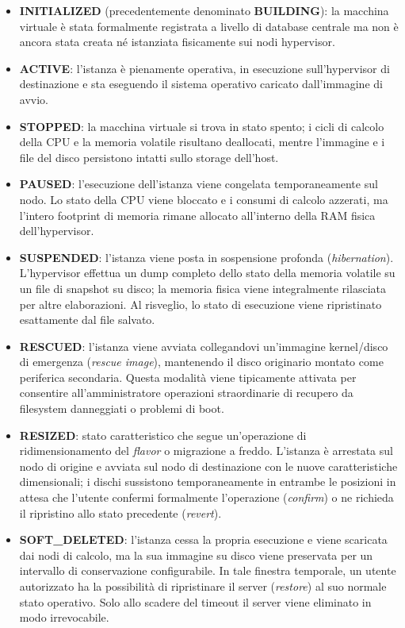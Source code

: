 \documentclass[11pt, a4paper]{article}
\begin{document}
\begin{itemize}[leftmargin=*]
    \item \textbf{INITIALIZED} (precedentemente denominato \textbf{BUILDING}): la macchina virtuale è stata formalmente registrata a livello di database centrale ma non è ancora stata creata né istanziata fisicamente sui nodi hypervisor.
    \item \textbf{ACTIVE}: l'istanza è pienamente operativa, in esecuzione sull'hypervisor di destinazione e sta eseguendo il sistema operativo caricato dall'immagine di avvio.
    \item \textbf{STOPPED}: la macchina virtuale si trova in stato spento; i cicli di calcolo della CPU e la memoria volatile risultano deallocati, mentre l'immagine e i file del disco persistono intatti sullo storage dell'host.
    \item \textbf{PAUSED}: l'esecuzione dell'istanza viene congelata temporaneamente sul nodo. Lo stato della CPU viene bloccato e i consumi di calcolo azzerati, ma l'intero footprint di memoria rimane allocato all'interno della RAM fisica dell'hypervisor.
    \item \textbf{SUSPENDED}: l'istanza viene posta in sospensione profonda (\emph{hibernation}). L'hypervisor effettua un dump completo dello stato della memoria volatile su un file di snapshot su disco; la memoria fisica viene integralmente rilasciata per altre elaborazioni. Al risveglio, lo stato di esecuzione viene ripristinato esattamente dal file salvato.
    \item \textbf{RESCUED}: l'istanza viene avviata collegandovi un'immagine kernel/disco di emergenza (\emph{rescue image}), mantenendo il disco originario montato come periferica secondaria. Questa modalità viene tipicamente attivata per consentire all'amministratore operazioni straordinarie di recupero da filesystem danneggiati o problemi di boot.
    \item \textbf{RESIZED}: stato caratteristico che segue un'operazione di ridimensionamento del \emph{flavor} o migrazione a freddo. L'istanza è arrestata sul nodo di origine e avviata sul nodo di destinazione con le nuove caratteristiche dimensionali; i dischi sussistono temporaneamente in entrambe le posizioni in attesa che l'utente confermi formalmente l'operazione (\emph{confirm}) o ne richieda il ripristino allo stato precedente (\emph{revert}).
    \item \textbf{SOFT\_DELETED}: l'istanza cessa la propria esecuzione e viene scaricata dai nodi di calcolo, ma la sua immagine su disco viene preservata per un intervallo di conservazione configurabile. In tale finestra temporale, un utente autorizzato ha la possibilità di ripristinare il server (\emph{restore}) al suo normale stato operativo. Solo allo scadere del timeout il server viene eliminato in modo irrevocabile.

\end{itemize}
\end{document}
